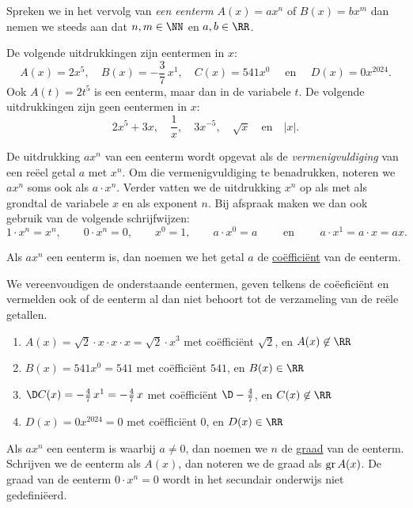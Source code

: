 \documentclass{ximera}
\begin{document}
Spreken we in het vervolg van {\em een eenterm} $A(x) = ax^n$ of $B(x) = bx^m$ dan nemen we steeds aan dat $n,m\in \NN$ en $a,b\in \RR$.

\begin{example}
De volgende uitdrukkingen zijn eentermen in $x$:
\[
A(x) = 2x^5, \quad B(x) = -\frac{3}{7}\,x^1, \quad C(x) = 541x^0 \quad \text{ en } \quad D(x) = 0x^{2024}.
\]
Ook $A(t) = 2t^5$ is een eenterm, maar dan in de variabele $t$. De volgende uitdrukkingen zijn geen eentermen in $x$:
\[
2x^5+3x, \quad \frac{1}{x}, \quad 3x^{-5}, \quad \sqrt{x} \quad \text{en} \quad \left|x\right|.
\] 
\end{example}

De uitdrukking $ax^n$ van een eenterm wordt opgevat als de {\em vermenigvuldiging} van een re\"eel getal $a$ met $x^n$. Om die vermenigvuldiging te benadrukken, noteren we $ax^n$ soms ook als $a \cdot x^n$. Verder vatten we de uitdrukking $x^n$ op als  met als grondtal de variabele $x$ en als exponent $n$. Bij afspraak maken we dan ook gebruik van de volgende schrijfwijzen:
\[
1\cdot x^n = x^n, \qquad
0\cdot x^n = 0, \qquad  
x^0 = 1, \qquad 
a\cdot x^0 = a \qquad \text{ en } \qquad 
a\cdot x^1 = a \cdot x = ax.
\]

Als $ax^n$ een eenterm is, dan noemen we het getal $a$ de \underline{co\"effici\"ent} van de eenterm.

\begin{example}
We vereenvoudigen de onderstaande eentermen, geven telkens de co\"eefici\"ent en vermelden ook of de eenterm al dan niet behoort tot de verzameling van de re\"ele getallen.
\begin{enumerate}

\item
$A(x) = \sqrt{2}\cdot x \cdot x \cdot x = \sqrt{2}\cdot x^3$ met co\"effici\"ent $\sqrt{2}$, en $A(x) \not\in \RR$
\item
$B(x) = 541x^0 = 541$ met co\"effici\"ent $541$, en $B(x) \in \RR$ 
\item
$\D C(x) = -\frac{4}{7}\,x^1 = -\frac{4}{7}\,x$ met co\"effici\"ent $\D -\frac{4}{7}$, en $C(x) \not\in \RR$
\item
$D(x) = 0 x^{2024} = 0$ met co\"effici\"ent $0$, en $D(x) \in \RR$ 
\end{enumerate}
\end{example}

Als $ax^n$ een eenterm is waarbij $a \neq 0$, dan noemen we $n$ de \underline{graad} van de eenterm. Schrijven we de eenterm als $A(x)$, dan noteren we de graad als $\operatorname{gr} A(x)$. De graad van de eenterm $0\cdot x^n = 0$ wordt in het secundair onderwijs niet gedefini\"eerd.
\end{document}
